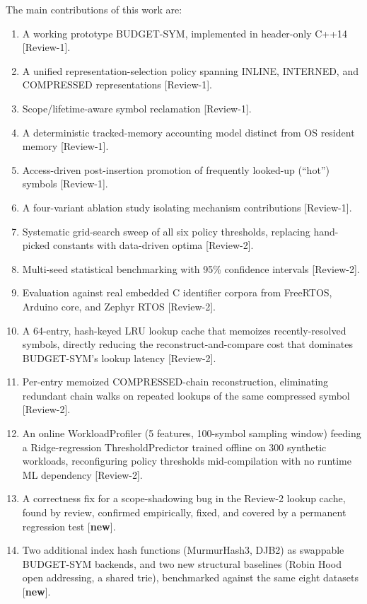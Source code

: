 \documentclass[conference]{IEEEtran}
\begin{document}
The main contributions of this work are:
\begin{enumerate}
\item A working prototype BUDGET-SYM, implemented in header-only C++14
  [Review-1].
\item A unified representation-selection policy spanning INLINE, INTERNED,
  and COMPRESSED representations [Review-1].
\item Scope/lifetime-aware symbol reclamation [Review-1].
\item A deterministic tracked-memory accounting model distinct from OS
  resident memory [Review-1].
\item Access-driven post-insertion promotion of frequently looked-up
  (``hot'') symbols [Review-1].
\item A four-variant ablation study isolating mechanism contributions
  [Review-1].
\item Systematic grid-search sweep of all six policy thresholds, replacing
  hand-picked constants with data-driven optima [Review-2].
\item Multi-seed statistical benchmarking with 95\% confidence intervals
  [Review-2].
\item Evaluation against real embedded C identifier corpora from FreeRTOS,
  Arduino core, and Zephyr RTOS [Review-2].
\item A 64-entry, hash-keyed LRU lookup cache that memoizes recently-resolved
  symbols, directly reducing the reconstruct-and-compare cost that dominates
  BUDGET-SYM's lookup latency [Review-2].
\item Per-entry memoized COMPRESSED-chain reconstruction, eliminating
  redundant chain walks on repeated lookups of the same compressed symbol
  [Review-2].
\item An online WorkloadProfiler (5 features, 100-symbol sampling window)
  feeding a Ridge-regression ThresholdPredictor trained offline on 300
  synthetic workloads, reconfiguring policy thresholds mid-compilation with
  no runtime ML dependency [Review-2].
\item A correctness fix for a scope-shadowing bug in the Review-2 lookup
  cache, found by review, confirmed empirically, fixed, and covered by a
  permanent regression test [\textbf{new}].
\item Two additional index hash functions (MurmurHash3, DJB2) as swappable
  BUDGET-SYM backends, and two new structural baselines (Robin Hood open
  addressing, a shared trie), benchmarked against the same eight datasets
  [\textbf{new}].
\end{enumerate}
\end{document}
